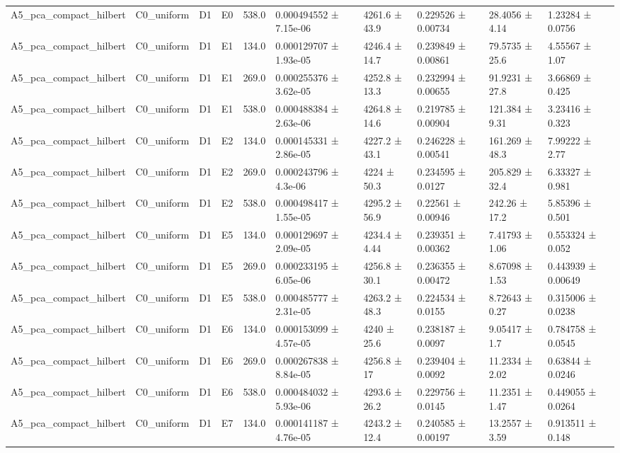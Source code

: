 \begin{table}
\begin{tabular}{llllllllll}
A5\_pca\_compact\_hilbert & C0\_uniform & D1 & E0 & 538.0 & 0.000494552 ± 7.15e-06 & 4261.6 ± 43.9 & 0.229526 ± 0.00734 & 28.4056 ± 4.14 & 1.23284 ± 0.0756 \\
A5\_pca\_compact\_hilbert & C0\_uniform & D1 & E1 & 134.0 & 0.000129707 ± 1.93e-05 & 4246.4 ± 14.7 & 0.239849 ± 0.00861 & 79.5735 ± 25.6 & 4.55567 ± 1.07 \\
A5\_pca\_compact\_hilbert & C0\_uniform & D1 & E1 & 269.0 & 0.000255376 ± 3.62e-05 & 4252.8 ± 13.3 & 0.232994 ± 0.00655 & 91.9231 ± 27.8 & 3.66869 ± 0.425 \\
A5\_pca\_compact\_hilbert & C0\_uniform & D1 & E1 & 538.0 & 0.000488384 ± 2.63e-06 & 4264.8 ± 14.6 & 0.219785 ± 0.00904 & 121.384 ± 9.31 & 3.23416 ± 0.323 \\
A5\_pca\_compact\_hilbert & C0\_uniform & D1 & E2 & 134.0 & 0.000145331 ± 2.86e-05 & 4227.2 ± 43.1 & 0.246228 ± 0.00541 & 161.269 ± 48.3 & 7.99222 ± 2.77 \\
A5\_pca\_compact\_hilbert & C0\_uniform & D1 & E2 & 269.0 & 0.000243796 ± 4.3e-06 & 4224 ± 50.3 & 0.234595 ± 0.0127 & 205.829 ± 32.4 & 6.33327 ± 0.981 \\
A5\_pca\_compact\_hilbert & C0\_uniform & D1 & E2 & 538.0 & 0.000498417 ± 1.55e-05 & 4295.2 ± 56.9 & 0.22561 ± 0.00946 & 242.26 ± 17.2 & 5.85396 ± 0.501 \\
A5\_pca\_compact\_hilbert & C0\_uniform & D1 & E5 & 134.0 & 0.000129697 ± 2.09e-05 & 4234.4 ± 4.44 & 0.239351 ± 0.00362 & 7.41793 ± 1.06 & 0.553324 ± 0.052 \\
A5\_pca\_compact\_hilbert & C0\_uniform & D1 & E5 & 269.0 & 0.000233195 ± 6.05e-06 & 4256.8 ± 30.1 & 0.236355 ± 0.00472 & 8.67098 ± 1.53 & 0.443939 ± 0.00649 \\
A5\_pca\_compact\_hilbert & C0\_uniform & D1 & E5 & 538.0 & 0.000485777 ± 2.31e-05 & 4263.2 ± 48.3 & 0.224534 ± 0.0155 & 8.72643 ± 0.27 & 0.315006 ± 0.0238 \\
A5\_pca\_compact\_hilbert & C0\_uniform & D1 & E6 & 134.0 & 0.000153099 ± 4.57e-05 & 4240 ± 25.6 & 0.238187 ± 0.0097 & 9.05417 ± 1.7 & 0.784758 ± 0.0545 \\
A5\_pca\_compact\_hilbert & C0\_uniform & D1 & E6 & 269.0 & 0.000267838 ± 8.84e-05 & 4256.8 ± 17 & 0.239404 ± 0.0092 & 11.2334 ± 2.02 & 0.63844 ± 0.0246 \\
A5\_pca\_compact\_hilbert & C0\_uniform & D1 & E6 & 538.0 & 0.000484032 ± 5.93e-06 & 4293.6 ± 26.2 & 0.229756 ± 0.0145 & 11.2351 ± 1.47 & 0.449055 ± 0.0264 \\
A5\_pca\_compact\_hilbert & C0\_uniform & D1 & E7 & 134.0 & 0.000141187 ± 4.76e-05 & 4243.2 ± 12.4 & 0.240585 ± 0.00197 & 13.2557 ± 3.59 & 0.913511 ± 0.148 \\

\end{tabular}
\end{table}

